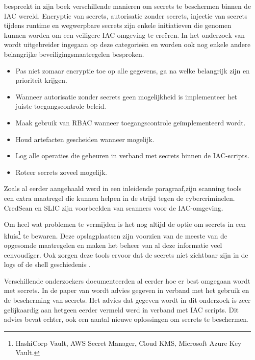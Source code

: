 \textcite{Morris2021} bespreekt in zijn boek verschillende manieren om secrets te beschermen binnen de IAC wereld. Encryptie van secrets, autorisatie zonder secrets, injectie van secrets tijdens runtime en wegwerpbare secrets zijn enkele initiatieven die genomen kunnen worden om een veiligere IAC-omgeving te creëren. In het onderzoek van \textcite{Rahman2021} wordt uitgebreider ingegaan op deze categorieën en worden ook nog enkele andere belangrijke beveiligingsmaatregelen besproken.

\begin{itemize}
  \item Pas niet zomaar encryptie toe op alle gegevens, ga na welke belangrijk zijn en prioriteit krijgen.
  \item Wanneer autorisatie zonder secrets geen mogelijkheid is implementeer het juiste toegangscontrole beleid.
  \item Maak gebruik van RBAC wanneer toegangscontrole geïmplementeerd wordt.
  \item Houd artefacten gescheiden wanneer mogelijk.
  \item Log alle operaties die gebeuren in verband met secrets binnen de IAC-scripts.
  \item Roteer secrets zoveel mogelijk.
\end{itemize}

Zoals al eerder aangehaald werd in een inleidende paragraaf,zijn scanning tools een extra maatregel die kunnen helpen in de strijd tegen de cybercriminelen. CredScan en SLIC zijn voorbeelden van scanners voor de IAC-omgeving.\autocite{Rahman2021} 
\newline

Om heel wat problemen te vermijden is het nog altijd de optie om secrets in een kluis\footnote{HashiCorp Vault, AWS Secret Manager, Cloud KMS, Microsoft Azure Key Vault.} te bewaren. Deze opslagplaatsen zijn voorzien van de meeste van de opgesomde maatregelen en maken het beheer van al deze informatie veel eenvoudiger. Ook zorgen deze tools ervoor dat de secrets niet zichtbaar zijn in de logs of de shell geschiedenis \autocite{Agarwal2021}. 
\clearpage

Verschillende onderzoekers documenteerden al eerder hoe er best omgegaan wordt met secrets. In de paper van \autocite{Basak2023} wordt advies gegeven in verband met het gebruik en de bescherming van secrets. Het advies dat gegeven wordt in dit onderzoek is zeer gelijkaardig aan hetgeen eerder vermeld werd in verband met IAC scripts. Dit advies bevat echter, ook een aantal nieuwe oplossingen om secrets te beschermen.

